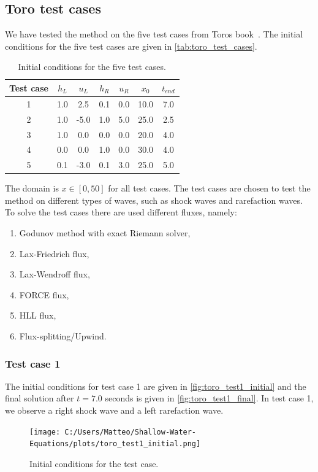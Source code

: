 \subsection{Toro test cases}
We have tested the method on the five test cases from Toros book~\cite{Toro2001-Shock}.
The initial conditions for the five test cases are given in \autoref{tab:toro_test_cases}.
\begin{table}[H]
    \centering
    \begin{tabular}{c|c|c|c|c|c|c}
        \hline
        \textbf{Test case} & \textbf{$h_L$} & \textbf{$u_L$} & \textbf{$h_R$} & \textbf{$u_R$} & \textbf{$x_0$} & \textbf{$t_{end}$} \\
        \hline\hline
        1 & 1.0 & 2.5 & 0.1 & 0.0 & 10.0 & 7.0 \\
        2 & 1.0 & -5.0 & 1.0 & 5.0 & 25.0 & 2.5 \\
        3 & 1.0 & 0.0 & 0.0 & 0.0 & 20.0 & 4.0 \\
        4 & 0.0 & 0.0 & 1.0 & 0.0 & 30.0 & 4.0 \\
        5 & 0.1 & -3.0 & 0.1 & 3.0 & 25.0 & 5.0 \\
        \hline
    \end{tabular}
    \caption{Initial conditions for the five test cases.}\label{tab:toro_test_cases}
\end{table}
The domain is $x \in [0, 50]$ for all test cases.
The test cases are chosen to test the method on different types of waves, such as shock waves and rarefaction waves.
To solve the test cases there are used different fluxes, namely:
\begin{enumerate}
    \item Godunov method with exact Riemann solver,
    \item Lax-Friedrich flux,
    \item Lax-Wendroff flux,
    \item FORCE flux,
    \item HLL flux,
    \item Flux-splitting/Upwind.
\end{enumerate}

\subsubsection{Test case 1}
The initial conditions for test case 1 are given in \autoref{fig:toro_test1_initial} and the final solution after $t=7.0$ seconds is given in \autoref{fig:toro_test1_final}.
In test case 1, we observe a right shock wave and a left rarefaction wave.
\begin{figure}[H]
    \centering
    \texttt{[image: C:/Users/Matteo/Shallow-Water-Equations/plots/toro\_test1\_initial.png]}
    \caption{Initial conditions for the test case.}\label{fig:toro_test1_initial}
\end{figure}

